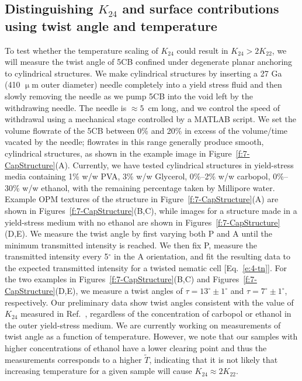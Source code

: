 \subsection{Distinguishing $K_{24}$ and surface contributions using twist angle and temperature}
To test whether the temperature scaling of $K_{24}$ could result in $K_{24} > 2 K_{22}$, we will measure the twist angle of 5CB confined under degenerate planar anchoring to cylindrical structures.
We make cylindrical structures by inserting a 27 Ga (410  $\upmu$m outer diameter) needle completely into a yield stress fluid and then slowly removing the needle as we pump 5CB into the void left by the withdrawing needle.
The needle is $\approx 5$~cm long, and we control the speed of withdrawal using a mechanical stage controlled by a MATLAB script.
We set the volume flowrate of the 5CB between 0\% and 20\% in excess of the volume/time vacated by the needle; flowrates in this range generally produce smooth, cylindrical structures, as shown in the example image in Figure~\ref{f:7-CapStructure}(A).
Currently, we have tested cylindrical structures in yield-stress media containing 1\% w/w PVA, 3\% w/w Glycerol, 0\%--2\% w/w carbopol, 0\%--30\% w/w ethanol, with the remaining percentage taken by Millipore water.
Example OPM textures of the structure in Figure~\ref{f:7-CapStructure}(A) are shown in Figures~\ref{f:7-CapStructure}(B,C), while images for a structure made in a yield-stress medium with no ethanol are shown in Figures~\ref{f:7-CapStructure}(D,E).
We measure the twist angle by first varying both P and A until the minimum transmitted intensity is reached.
We then fix P, measure the transmitted intensity every 5$^\circ$ in the A orientation, and fit the resulting data to the expected transmitted intensity for a twisted nematic cell [Eq.~\ref{e:4-tn}].
For the two examples in Figures~\ref{f:7-CapStructure}(B,C) and Figures~\ref{f:7-CapStructure}(D,E), we measure a twist angles of $\tau = 13^{\circ} \pm 1^{\circ}$ and $\tau = 7^{\circ} \pm 1^{\circ}$, respectively.
Our preliminary data show twist angles consistent with the value of $K_{24}$ measured in Ref.~\cite{RN24}, regardless of the concentration of carbopol or ethanol in the outer yield-stress medium.
We are currently working on measurements of twist angle as a function of temperature.
However, we note that our samples with higher concentrations of ethanol have a lower clearing point and thus the measurements corresponds to a higher $\tilde{T}$, indicating that it is not likely that increasing temperature for a given sample will cause $K_{24} \approx 2 K_{22}$.
